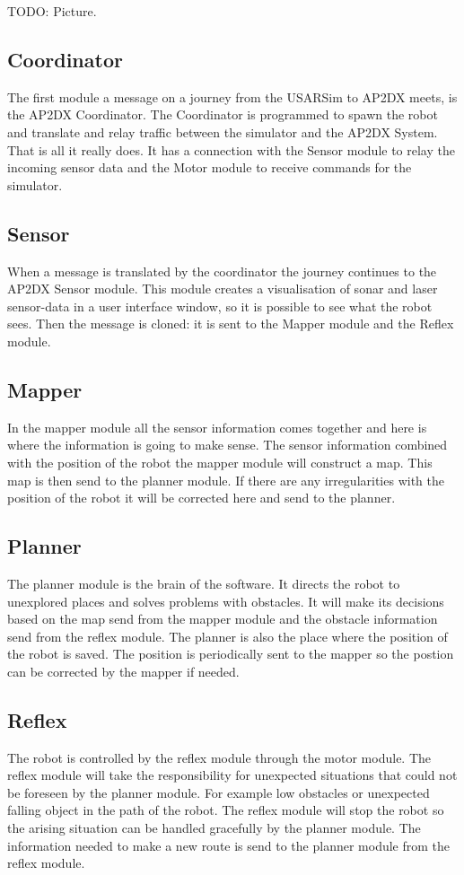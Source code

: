 \documentclass[titlepage, a4paper,10pt]{article}
\begin{document}
TODO: Picture.

\subsection{Coordinator}
The first module a message on a journey from the USARSim to AP2DX meets, is the AP2DX Coordinator. The Coordinator is programmed to spawn the robot and translate and relay traffic between the simulator and the AP2DX System. That is all it really does. It has a connection with the Sensor module to relay the incoming sensor data and the Motor module to receive commands for the simulator.

\subsection{Sensor}
When a message is translated by the coordinator the journey continues to the AP2DX Sensor module. This module creates a visualisation of sonar and laser sensor-data in a user interface window, so it is possible to see what the robot sees. Then the message is cloned: it is sent to the Mapper module and the Reflex module.

\subsection{Mapper}
In the mapper module all the sensor information comes together and here is where the information is going to make sense. The sensor information combined with the position of the robot the mapper module will construct a map. This map is then send to the planner module. If there are any irregularities with the position of the robot it will be corrected here and send to the planner.

\subsection{Planner}
The planner module is the brain of the software. It directs the robot to unexplored places and solves problems with obstacles. It will make its decisions based on the map send from the mapper module and the obstacle information send from the reflex module. The planner is also the place where the position of the robot is saved. The position is periodically sent to the mapper so the postion can be corrected by the mapper if needed.

\subsection{Reflex}
The robot is controlled by the reflex module through the motor module. The reflex module will take the responsibility for unexpected situations that could not be foreseen by the planner module. For example low obstacles or unexpected falling object in the path of the robot. The reflex module will stop the robot so the arising situation can be handled gracefully by the planner module. The information needed to make a new route is send to the planner module from the reflex module.
\end{document}
